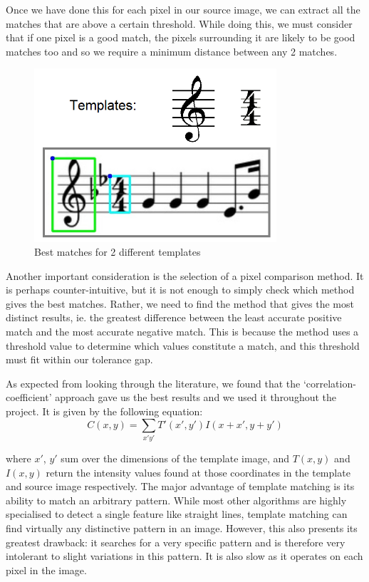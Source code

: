 Once we have done this for each pixel in our source image, we can extract all the matches that are above a certain threshold. While doing this, we must consider that if one pixel is a good match, the pixels surrounding it are likely to be good matches too and so we require a minimum distance between any 2 matches.
    
            \begin{figure}[h!]
                \centering
                \includegraphics[width=90mm]{./assets/templatematch.png}
                \caption{Best matches for 2 different templates}
                \label{image:templatematch}
            \end{figure}

Another important consideration is the selection of a pixel comparison method. It is perhaps counter-intuitive, but it is not enough to simply check which method gives the best matches. Rather, we need to find the method that gives the most distinct results, ie. the greatest difference between the least accurate positive match and the most accurate negative match. This is because the method uses a threshold value to determine
which values constitute a match, and this threshold must fit within our tolerance gap.

As expected from looking through the literature, we found that the ‘correlation-coefficient’ approach gave us the best results and we used it throughout the project.  
It is given by the following equation:
\begin{equation}
	C(x,y) = \sum_{x'y'} T'(x',y') I(x+x',y+y')
\end{equation}

where $x'$, $y'$ sum over the dimensions of the template image, and $T(x,y)$ and $I(x,y)$ return the intensity values found at those coordinates in the template and source image respectively.
The major advantage of template matching is its ability to match an arbitrary pattern. While most other algorithms are highly specialised to detect a single feature like straight lines, template matching can find virtually any distinctive pattern in an image. However, this also presents its greatest drawback: it searches for a very specific pattern and is therefore very intolerant to slight variations in this pattern. It
is also slow as it operates on each pixel in the image.

